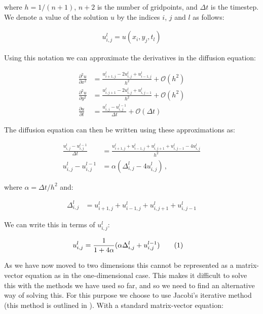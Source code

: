 \documentclass[reprint,english,notitlepage]{revtex4-1}  %
\newcommand\numberthis{\addtocounter{equation}{1}\tag{\theequation}}
\begin{document}
where $h = 1/(n+1)$, $n+2$ is the number of gridpoints, and $\Delta t$ is the timestep. We denote a value of the solution $u$ by the indices $i$, $j$ and $l$ as follows:

\begin{align*}
u_{i,j}^l = u(x_i,y_j,t_l)
\end{align*}

Using this notation we can approximate the derivatives in the diffusion equation:

\begin{align*}
\frac{\partial^2 u}{\partial x^2} &= \frac{u_{i+1,j}^l - 2u_{i,j}^l + u_{i-1,j}^l}{h^2} + \mathcal{O}(h^2) \\
\frac{\partial^2 u}{\partial y^2} &= \frac{u_{i,j+1}^l - 2u_{i,j}^l + u_{i,j-1}^l}{h^2} + \mathcal{O}(h^2)\\
\frac{\partial u}{\partial t} &= \frac{u_{i,j}^l - u_{i,j}^{l-1} }{\Delta t} + \mathcal{O}(\Delta t)
\end{align*}

The diffusion equation can then be written using these approximations as:

\begin{align*}
\frac{u_{i,j}^l - u_{i,j}^{l-1} }{\Delta t}  &= \frac{u_{i+1,j}^l + u_{i-1,j}^l + u_{i,j+1}^l + u_{i,j-1}^l - 4u_{i,j}^l}{h^2} \\
u_{i,j}^l - u_{i,j}^{l-1} &= \alpha(\Delta_{i,j}^l - 4u_{i,j}^l) \, , 
\end{align*}

where $\alpha = \Delta t /h^2$ and:

\begin{align*}
\Delta_{i,j}^l &= u_{i+1,j}^l + u_{i-1,j}^l + u_{i,j+1}^l + u_{i,j-1}^l
\end{align*}

We can write this in terms of $u_{i,j}^l$:

\begin{align*}
u_{i,j}^l &= \frac{1}{1 + 4\alpha} (\alpha \Delta_{i,j}^l + u_{i,j}^{l-1} ) \numberthis \label{eq:2D_diff_eq_numerical_solution}
\end{align*}

As we have now moved to two dimensions this cannot be represented as a matrix-vector equation as in the one-dimensional case. This makes it difficult to solve this with the methods we have used so far, and so we need to find an alternative way of solving this. For this purpose we choose to use Jacobi's iterative method (this method is outlined in \cite[p~.189-190]{Hjorth-Jensen2015}). With a standard matrix-vector equation:
\end{document}
